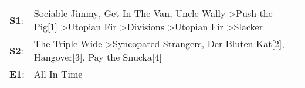 \begin{supertabular}{p{0.03\textwidth}p{0.92\textwidth}}
 \textbf{S1}:  &  Sociable Jimmy\textsuperscript{}, \enspace Get In The Van\textsuperscript{}, \enspace Uncle Wally\textsuperscript{} \textgreater \enspace Push the Pig[1]\textsuperscript{} \textgreater \enspace Utopian Fir\textsuperscript{} \textgreater \enspace Divisions\textsuperscript{} \textgreater \enspace Utopian Fir\textsuperscript{} \textgreater \enspace Slacker\textsuperscript{}  \enspace  \\
 \textbf{S2}:  &                                                                                                                                                     The Triple Wide\textsuperscript{} \textgreater \enspace Syncopated Strangers\textsuperscript{}, \enspace Der Bluten Kat[2]\textsuperscript{}, \enspace Hangover[3]\textsuperscript{}, \enspace Pay the Snucka[4]\textsuperscript{}  \enspace  \\
 \textbf{E1}:  &                                                                                                                                                                                                                                                                                                                                                          All In Time\textsuperscript{}  \enspace  \\
\end{supertabular}
